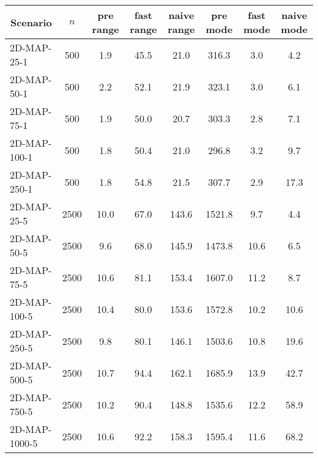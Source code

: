 \documentclass{article}
\begin{document}
\begin{center}
\begin{table}[h]
        \begin{tabular}{|l||c|c|c|c|c|c|c|}
            \hline
            \multicolumn{1}{|c|}{Scenario} & $n$   & pre range & fast range & naive range & pre mode & fast mode & naive mode \\
            \hline
            \hline
            2D-MAP-25-1                    & 500   & 1.9       & 45.5       & 21.0        & 316.3    & 3.0       & 4.2        \\
            2D-MAP-50-1                    & 500   & 2.2       & 52.1       & 21.9        & 323.1    & 3.0       & 6.1        \\
            2D-MAP-75-1                    & 500   & 1.9       & 50.0       & 20.7        & 303.3    & 2.8       & 7.1        \\
            2D-MAP-100-1                   & 500   & 1.8       & 50.4       & 21.0        & 296.8    & 3.2       & 9.7        \\
            2D-MAP-250-1                   & 500   & 1.8       & 54.8       & 21.5        & 307.7    & 2.9       & 17.3       \\
            \hline
            2D-MAP-25-5                    & 2500  & 10.0      & 67.0       & 143.6       & 1521.8   & 9.7       & 4.4        \\
            2D-MAP-50-5                    & 2500  & 9.6       & 68.0       & 145.9       & 1473.8   & 10.6      & 6.5        \\
            2D-MAP-75-5                    & 2500  & 10.6      & 81.1       & 153.4       & 1607.0   & 11.2      & 8.7        \\
            2D-MAP-100-5                   & 2500  & 10.4      & 80.0       & 153.6       & 1572.8   & 10.2      & 10.6       \\
            2D-MAP-250-5                   & 2500  & 9.8       & 80.1       & 146.1       & 1503.6   & 10.8      & 19.6       \\
            2D-MAP-500-5                   & 2500  & 10.7      & 94.4       & 162.1       & 1685.9   & 13.9      & 42.7       \\
            2D-MAP-750-5                   & 2500  & 10.2      & 90.4       & 148.8       & 1535.6   & 12.2      & 58.9       \\
            2D-MAP-1000-5                  & 2500  & 10.6      & 92.2       & 158.3       & 1595.4   & 11.6      & 68.2       \\

\end{tabular}
\end{table}
\end{center}
\end{document}
